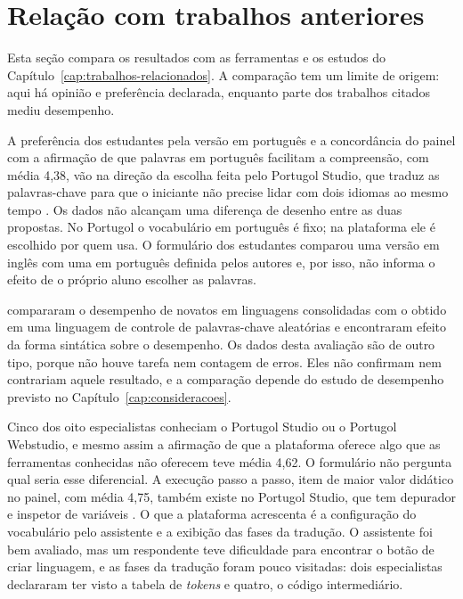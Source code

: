 \section{Relação com trabalhos anteriores}
\label{sec:resultado-literatura}

Esta seção compara os resultados com as ferramentas e os estudos do Capítulo~\ref{cap:trabalhos-relacionados}. A comparação tem um limite de origem: aqui há opinião e preferência declarada, enquanto parte dos trabalhos citados mediu desempenho.

A preferência dos estudantes pela versão em português e a concordância do painel com a afirmação de que palavras em português facilitam a compreensão, com média 4,38, vão na direção da escolha feita pelo Portugol Studio, que traduz as palavras-chave para que o iniciante não precise lidar com dois idiomas ao mesmo tempo \cite{univali2026}. Os dados não alcançam uma diferença de desenho entre as duas propostas. No Portugol o vocabulário em português é fixo; na plataforma ele é escolhido por quem usa. O formulário dos estudantes comparou uma versão em inglês com uma em português definida pelos autores e, por isso, não informa o efeito de o próprio aluno escolher as palavras.

 compararam o desempenho de novatos em linguagens consolidadas com o obtido em uma linguagem de controle de palavras-chave aleatórias e encontraram efeito da forma sintática sobre o desempenho. Os dados desta avaliação são de outro tipo, porque não houve tarefa nem contagem de erros. Eles não confirmam nem contrariam aquele resultado, e a comparação depende do estudo de desempenho previsto no Capítulo~\ref{cap:consideracoes}.

Cinco dos oito especialistas conheciam o Portugol Studio ou o Portugol Webstudio, e mesmo assim a afirmação de que a plataforma oferece algo que as ferramentas conhecidas não oferecem teve média 4,62. O formulário não pergunta qual seria esse diferencial. A execução passo a passo, item de maior valor didático no painel, com média 4,75, também existe no Portugol Studio, que tem depurador e inspetor de variáveis \cite{univali2026}. O que a plataforma acrescenta é a configuração do vocabulário pelo assistente e a exibição das fases da tradução. O assistente foi bem avaliado, mas um respondente teve dificuldade para encontrar o botão de criar linguagem, e as fases da tradução foram pouco visitadas: dois especialistas declararam ter visto a tabela de \textit{tokens} e quatro, o código intermediário.

